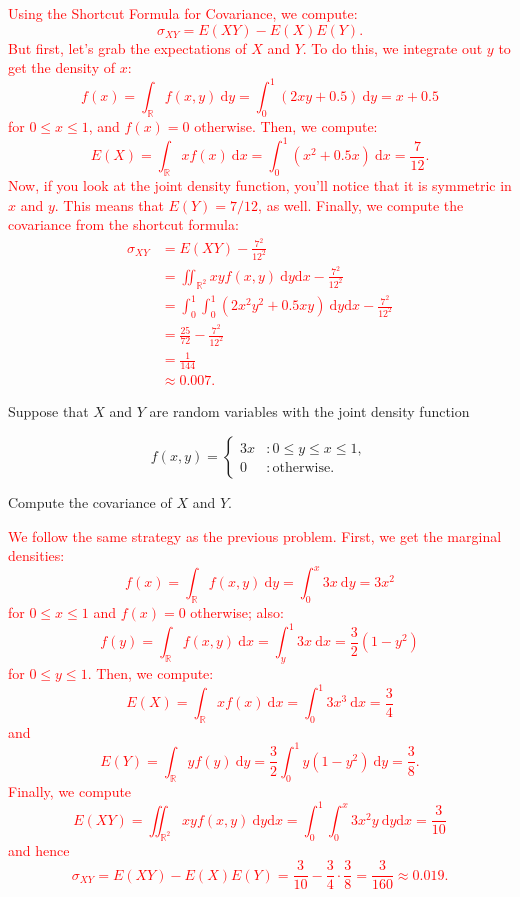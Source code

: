 \documentclass[12pt,reqno]{amsart}
\begin{document}
\bigskip
\textcolor{red}{Using the Shortcut Formula for Covariance, we compute:
	\[
	\sigma_{XY} = E(XY) - E(X) E(Y).
	\]
But first, let's grab the expectations of $X$ and $Y$. To do this, we integrate out $y$ to get the density of $x$:
	\[f(x) = \int_{\mathbb{R}} f(x,y) \ \text{d} y = \int_0^1 \left( 2xy+0.5\right) \ \text{d}y = x + 0.5
	\]
for $0\leq x\leq 1$, and $f(x)=0$ otherwise. Then, we compute:
	\[E(X) = \int_{\mathbb{R}} x f(x) \ \text{d}x = \int_0^1 (x^2+0.5x) \ \text{d} x = \frac{7}{12}.
	\]
Now, if you look at the joint density function, you'll notice that it is symmetric in $x$ and $y$. This means that $E(Y) = 7/12$, as well. Finally, we compute the covariance from the shortcut formula:
	\begin{align*}
	\sigma_{XY} &= E(XY) - \frac{7^2}{12^2} \\
	&= \iint_{\mathbb{R}^2} xy f(x,y) \ \text{d}y \text{d}x - \frac{7^2}{12^2} \\
	&= \int_0^1 \int_0^1 (2x^2y^2 + 0.5xy) \ \text{d}y \text{d}x - \frac{7^2}{12^2} \\
	&= \frac{25}{72} - \frac{7^2}{12^2} \\
	&= \frac{1}{144} \\
	&\approx 0.007.
	\end{align*}}













\bigskip
\prob Suppose that $X$ and $Y$ are random variables with the joint density function

	\[
	f(x,y) = \begin{cases}
	3x & : 0 \leq y\leq x \leq 1, \\
	0 & : \text{otherwise}.
	\end{cases}
	\]
	
Compute the covariance of $X$ and $Y$.


\bigskip
\textcolor{red}{We follow the same strategy as the previous problem. First, we get the marginal densities:
	\[f(x) = \int_{\mathbb{R}} f(x,y) \ \text{d}y = \int_0^x 3x \ \text{d}y = 3x^2
	\]
for $0\leq x \leq 1$ and $f(x)=0$ otherwise; also:
	\[f(y) = \int_{\mathbb{R}} f(x,y) \ \text{d} x = \int_y^1 3x \ \text{d}x = \frac{3}{2}(1-y^2)
	\]
for $0\leq y \leq 1$. Then, we compute:
	\[E(X) = \int_{\mathbb{R}} x f(x) \ \text{d}x = \int_0^1 3x^3 \ \text{d}x = \frac{3}{4}
	\]
and
	\[E(Y) = \int_{\mathbb{R}} y f(y) \ \text{d}y = \frac{3}{2} \int_0^1 y (1-y^2) \ \text{d}y = \frac{3}{8}.
	\]
Finally, we compute
	\[E(XY) = \iint_{\mathbb{R}^2} xy f(x,y) \ \text{d}y\text{d}x = \int_0^1 \int_0^x 3x^2y \ \text{d}y\text{d}x = \frac{3}{10}
	\]
and hence
	\[\sigma_{XY} = E(XY) - E(X) E(Y) = \frac{3}{10} - \frac{3}{4} \cdot \frac{3}{8} = \frac{3}{160} \approx 0.019.
	\]}
	
\end{document}
